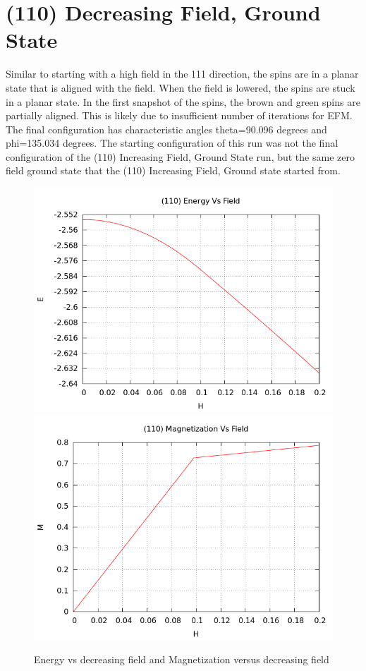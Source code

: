\documentclass{article}
\begin{document}
\section{(110) Decreasing Field, Ground State}
Similar to starting with a high field in the 111 direction, the spins are in a planar state that is
aligned with the field. When the field is lowered, the spins are stuck in a planar state. In the first
snapshot of the spins, the brown and green spins are partially aligned. This is likely due to insufficient
number of iterations for EFM. The final configuration has characteristic angles theta=90.096 degrees and phi=135.034 degrees.
The starting configuration of this run
was not the final configuration of the (110) Increasing Field, Ground State run, but the same zero field ground state
that the (110) Increasing Field, Ground state started from.
\begin{figure}[h]
 \centering 
\includegraphics[scale=0.3]{HVariedData/Decreasing/110Edec.png}
\includegraphics[scale=0.3]{HVariedData/Decreasing/110Mdec.png}
\caption{Energy vs decreasing field and Magnetization versus decreasing field}
\end{figure}
\end{document}
